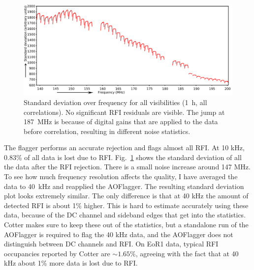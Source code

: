 \documentclass[a4paper,10pt]{article}
\begin{document}
\begin{figure}
\begin{center}
\includegraphics[width=12cm]{stddev-spectrum.pdf}
\caption{Standard deviation over frequency for all visibilities (1~h, all correlations). No significant RFI residuals are visible. The jump at 187~MHz is because of digital gains that are applied to the data before correlation, resulting in different noise statistics.}
\label{fig:stddev-spectrum}
\end{center}
\end{figure}

The flagger performs an accurate rejection and flags almost all RFI. At 10 kHz, 0.83\% of all data is lost due to RFI. Fig.~\ref{fig:stddev-spectrum} shows the standard deviation of all the data after the RFI rejection. There is a small noise increase around 147 MHz. To see how much frequency resolution affects the quality, I have averaged the data to 40~kHz and reapplied the AOFlagger. The resulting standard deviation plot looks extremely similar. The only difference is that at 40 kHz the amount of detected RFI is about 1\% higher. This is hard to estimate accurately using these data, because of the DC channel and sideband edges that get into the statistics. Cotter makes sure to keep these out of the statistics, but a standalone run of the AOFlagger is required to flag the 40 kHz data, and the AOFlagger does not distinguish between DC channels and RFI. On EoR1 data, typical RFI occupancies reported by Cotter are $\sim 1.65$\%, agreeing with the fact that at 40 kHz about 1\% more data is lost due to RFI.
\end{document}
